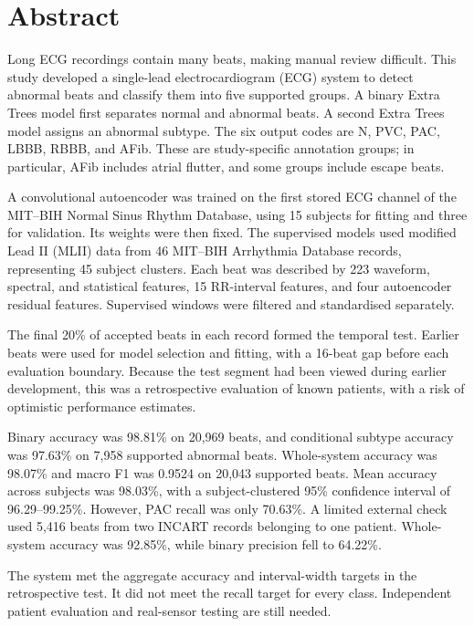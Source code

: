 \chapter*{Abstract}\label{abstract}
{}
\prevspace
Long ECG recordings contain many beats, making manual review difficult.
This study developed a single-lead electrocardiogram (ECG) system to detect
abnormal beats and classify them into five supported groups. A binary Extra
Trees model first separates normal and abnormal beats. A second Extra Trees
model assigns an abnormal subtype. The six output codes are N, PVC, PAC,
LBBB, RBBB, and AFib. These are study-specific annotation groups; in
particular, AFib includes atrial flutter, and some groups include escape beats.

A convolutional autoencoder was trained on the first stored ECG channel of
the MIT--BIH Normal Sinus Rhythm Database, using 15 subjects for fitting and
three for validation. Its weights were then fixed. The supervised models
used modified Lead II (MLII) data from 46 MIT--BIH Arrhythmia Database records,
representing 45 subject clusters. Each beat was described by 223 waveform,
spectral, and statistical features, 15 RR-interval features, and four
autoencoder residual features. Supervised windows were filtered and
standardised separately.

The final 20\% of accepted beats in each record formed the temporal test.
Earlier beats were used for model selection and fitting, with a 16-beat gap
before each evaluation boundary. Because the test segment had been viewed
during earlier development, this was a retrospective evaluation of known
patients, with a risk of optimistic performance estimates.

Binary accuracy was 98.81\% on 20,969 beats, and conditional subtype accuracy
was 97.63\% on 7,958 supported abnormal beats. Whole-system accuracy was
98.07\% and macro F1 was 0.9524 on 20,043 supported beats. Mean accuracy
across subjects was 98.03\%, with a subject-clustered 95\% confidence interval
of 96.29--99.25\%. However, PAC recall was only 70.63\%. A limited external
check used 5,416 beats from two INCART records belonging to one patient.
Whole-system accuracy was 92.85\%, while binary precision fell to 64.22\%.

The system met the aggregate accuracy and interval-width targets in the
retrospective test. It did not meet the recall target for every class.
Independent patient evaluation and real-sensor testing are still needed.
